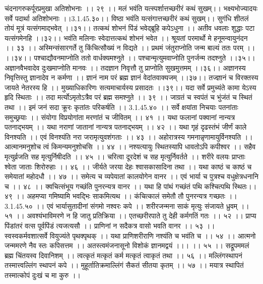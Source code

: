 चंदनागरुकर्पूरप्रमुखा अतिशोभनाः ।। २९ ।।
मलं भवंति यत्स्पर्शात्तच्छरीरं कथं सुखम्।।
भक्ष्यभोज्यादयः सर्वे पदार्था अतिशोभनाः ।।3.1.45.३०।।
विष्ठा भवंति यत्संगात्तच्छरीरं कथं सुखम्।।
सुगंधि शीतलं तोयं मूत्रं यत्संगमाद्भवेत् ।।३१।।
तत्कथं शोभनं पिंडं भवेद्ब्रूहि कपेऽधुना ।।
अतीव धवलाः शुद्धाः पटा यत्संगमेनहि ।।३२।।
भवंति मलिनाः स्वेदात्तत्कथं शोभनं भवेत ।।
श्रूयतां परमार्थो मे हनूमन्वायुनंदन ।। ३३ ।।
अस्मिन्संसारगर्ते तु किंचित्सौख्यं न विद्यते ।।
प्रथमं जंतुराप्नोति जन्म बाल्यं ततः परम् ।। ।।३४।।
पश्चाद्यौवनमाप्नोति ततो वार्धक्यमश्नुते ।।
पश्चान्मृत्युमवाप्नोति पुनर्जन्म तदश्नुते ।।३५।।
अज्ञानवैभवादेव दुःखमाप्नोति मानवः ।।
तदज्ञान निवृत्तौ तु प्राप्नोति सुखमुत्तमम् ।।३६।।
अज्ञानस्य निवृत्तिस्तु ज्ञानादेव न कर्मणा ।।
ज्ञानं नाम परं ब्रह्म ज्ञानं वेदांतवाक्यजम् ।।३७।।
तज्ज्ञानं च विरक्तस्य जायते नेतरस्य हि ।।
मुख्याधिकारिणः सत्यमाचार्यस्य प्रसादतः ।।३९।।
यदा सर्वे प्रमुच्यंते कामा येऽस्य हृदि स्थिताः ।।
तदा मर्त्योऽमृतोऽत्रैव परं ब्रह्म समश्नुते ।। ३९ ।।
जाग्रतं च स्वपंतं च भुंजंतं च स्थितं तथा ।।
इमं जनं सदा क्रूरः कृतांतः परिकर्षति ।। 3.1.45.४० ।।
सर्वे क्षयांता निचयाः पतनांताः समुच्छ्रयाः ।।
संयोगा विप्रयोगांता मरणांतं च जीवितम् ।। ४१ ।।
यथा फलानां पक्वानां नान्यत्र पतनाद्भयम् ।।
यथा नराणां जातानां नान्यत्र पतनाद्भयम् ।। ४२ ।।
यथा गृहं दृढस्तंभं जीर्णं काले विनश्यति ।।
एवं विनश्यंति नरा जरामृत्युवशंगताः ।। ४३ ।।
अहोरात्रस्य गमनान्नृणामायुर्विनश्यति ।।
आत्मानमनुशोच त्वं किमन्यमनुशोचसि ।। ४४ ।।
नश्यत्यायुः स्थितस्यापि धावतोऽपि कपीश्वर ।।
सहैव मृत्युर्व्रजति सह मृत्युर्निषीदति ।। ४५ ।।
चरित्वा दूरदेशं च सह मृत्युर्निवर्तते ।।
शरीरे वलयः प्राप्ताः श्वेता जाताः शिरोरुहाः ।। ४६ ।।
जीर्यते जरया देहः श्वासकासादिना तथा ।।
यथा काष्ठं च काष्ठं च समेयातां महोदधौ ।। ४७ ।।
समेत्य च व्यपेयातां कालयोगेन वानर ।।
एवं भार्या च पुत्रश्च वधुक्षेत्रधनानि च ।। ४८ ।।
क्वचित्संभूय गच्छंति पुनरन्यत्र वानर ।।
यथा हि पांथं गच्छंतं पथि कश्चित्पथि स्थितः।। ४९ ।।
अहमप्या गमिष्यामि भवद्भिः साकमित्यथ ।।
कंचित्कालं समेतौ तौ पुनरन्यत्र गच्छतः ।। 3.1.45.५० ।।
एवं भार्यासुतादीनां संगमो नश्वरः कपे ।।
शरीरजन्मना साकं मृत्युः संजायते ध्रुवम् ।। ५१ ।।
अवश्यंभाविमरणे न हि जातु प्रतिक्रिया ।।
एतच्छरीरपाते तु देही कर्मगतिं गतः ।। ५२ ।।
प्राप्य पिंडांतरं वत्स पूर्वपिंडं त्यजत्यसौ ।।
प्राणिनां न सदैकत्र वासो भवति वानर ।। ५३ ।।
स्वस्वकर्मवशात्सर्वे वियुज्यंते पृथक्पृथक् ।।
यथा प्राणिशरीराणि नश्यंति च भवंति च ।। ५४ ।।
आत्मनो जन्ममरणे नैव स्तः कपिसत्तम ।।
अतस्त्वमंजनासूनो विशोकं ज्ञानमद्वयं ।।। ।। ५५ ।।
सद्रूपममलं ब्रह्म चिंतयस्व दिवानिशम् ।।
त्वत्कृतं मत्कृतं कर्म मत्कृतं त्वाकृतं तथा ।। ५६ ।।
मल्लिंगस्थापनं तस्मात्त्वल्लिंग स्थापनं कपे ।।
मुहूर्तातिक्रमाल्लिंगं सैकतं सीतया कृतम् ।। ५७ ।।
मयात्र स्थापितं तस्मात्कोपं दुःखं च मा कुरु ।।
